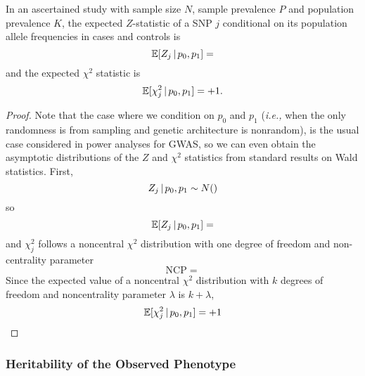 \documentclass[11pt]{article}
\numberwithin{equation}{section}
\numberwithin{definition}{section}
\numberwithin{thm}{section}
\numberwithin{lemma}{section}
\numberwithin{prop}{section}
\numberwithin{cor}{section}
\numberwithin{hyp}{section}
\begin{document}
\begin{lemma}
In an ascertained study with sample size $N$, sample prevalence $P$ and population prevalence $K$, the expected $Z$-statistic of a SNP $j$
conditional on its population allele frequencies in cases and controls is
\begin{equation}
	\mathbb{E}[Z_j\,|\, p_0,p_1] =
\end{equation}
and the expected $\chi^2$ statistic is
\begin{equation}
	\mathbb{E}[\chi^2_j\,|\, p_0,p_1] = +1.
\end{equation}
\end{lemma}
\begin{proof}

Note that the case where we condition on $p_0$ and $p_1$ 
(\emph{i.e.,} when the only randomness is from sampling and genetic architecture is nonrandom),
is the usual case considered in power analyses for GWAS, so we can even obtain the asymptotic distributions of
the $Z$ and $\chi^2$ statistics from standard results on Wald statistics.
First,
\begin{equation*}
	Z_j\,|\, p_0, p_1 \sim N()
\end{equation*}
so
\begin{equation*}
	\mathbb{E}[Z_j\,|\, p_0,p_1] =
\end{equation*}
and $\chi^2_j$ follows a noncentral $\chi^2$ distribution with one degree of freedom and non-centrality parameter
\begin{equation*}
	\mathrm{NCP} =
\end{equation*}
Since the expected value of a noncentral $\chi^2$ distribution with $k$ degrees of freedom and noncentrality parameter $\lambda$ is 
$k+\lambda$,
\begin{equation*}
	\mathbb{E}[\chi^2_j\,|\, p_0, p_1] = +1
\end{equation*}
\end{proof}

\subsubsection{Heritability of the Observed Phenotype}\label{CCA:Heritability}
\end{document}
